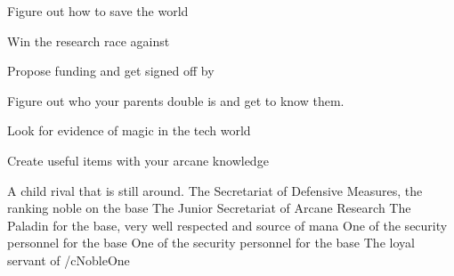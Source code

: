 \documentclass[char]{guildcamp3}
\begin{document}
\begin{itemz}[Goals]
  \item Figure out how to save the world
  \item Win the research race against \cMageTwo{}
  \item Propose funding and get signed off by \cNobleTwo{}
  \item Figure out who your parents double is and get to know them.
  \item Look for evidence of magic in the tech world
  \item Create useful items with your arcane knowledge
\end{itemz}



\begin{contacts}
  \contact{\cMageTwo{}} A child rival that is still around.
  \contact{\cNobleOne{}} The Secretariat of Defensive Measures, the ranking noble on the base
  \contact{\cNobleTwo{}} The Junior Secretariat of Arcane Research
  \contact{\cPaladin{}} The Paladin for the base, very well respected and source of mana 
  \contact{\cRogueOne{}} One of the security personnel for the base
  \contact{\cRogueTwo{}} One of the security personnel for the base
  \contact{\cServant{}} The loyal servant of /cNobleOne{} 
\end{contacts}
\end{document}
